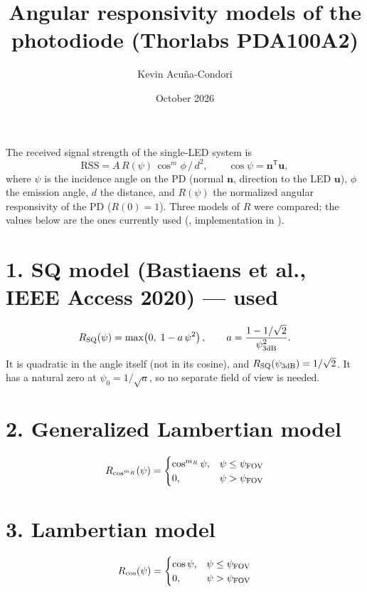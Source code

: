 \documentclass[10.5pt,a4paper]{article}
\title{\vspace{-14mm}\textbf{Angular responsivity models of the photodiode (Thorlabs PDA100A2)}}
\author{Kevin Acu\~na-Condori}
\date{October 2026}
\begin{document}
\maketitle
\vspace{-6mm}

\noindent The received signal strength of the single-LED system is
\begin{equation}
  \mathrm{RSS} = A\,R(\psi)\,\cos^{m}\phi\,/\,d^{2},\qquad \cos\psi = \mathbf n^{\mathsf T}\mathbf u ,
\end{equation}
where $\psi$ is the incidence angle on the PD (normal $\mathbf n$, direction to the LED $\mathbf u$),
$\phi$ the emission angle, $d$ the distance, and $R(\psi)$ the normalized angular responsivity of the PD
($R(0)=1$). Three models of $R$ were compared; the values below are the ones currently used
(, implementation in ).

\section*{1. SQ model (Bastiaens et al., IEEE Access 2020) --- used}
\begin{equation}
  R_{\rm SQ}(\psi) = \max\!\left(0,\; 1 - a\,\psi^{2}\right),\qquad
  a = \frac{1 - 1/\sqrt{2}}{\psi_{3\rm dB}^{2}} .
\end{equation}
It is quadratic in the angle itself (not in its cosine), and $R_{\rm SQ}(\psi_{3\rm dB}) = 1/\sqrt2$. It
has a natural zero at $\psi_0 = 1/\sqrt{a}$, so no separate field of view is needed.

\section*{2. Generalized Lambertian model}
\begin{equation}
  R_{\cos^{m_R}}(\psi) = \begin{cases} \cos^{m_R}\psi, & \psi \le \psi_{\rm FOV}\\ 0, & \psi > \psi_{\rm FOV}\end{cases}
\end{equation}

\section*{3. Lambertian model}
\begin{equation}
  R_{\cos}(\psi) = \begin{cases} \cos\psi, & \psi \le \psi_{\rm FOV}\\ 0, & \psi > \psi_{\rm FOV}\end{cases}
\end{equation}
\end{document}
